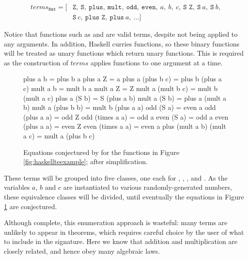 \begin{align*}
  terms_{\texttt{Nat}} = [& \texttt{Z},\ \texttt{S},\ \texttt{plus},\ \texttt{mult},\ \texttt{odd},\ \texttt{even},\ a,\ b,\ c,\ \texttt{S Z},\ \texttt{S}\ a,\ \texttt{S}\ b, \\
                     & \texttt{S}\ c,\ \texttt{plus Z},\ \texttt{plus}\ a,\ \dots ]
\end{align*}

Notice that functions such as  and  are valid terms, despite
not being applied to any arguments. In addition, Haskell curries functions, so
these binary functions will be treated as unary functions which return unary
functions. This is required as the construction of $terms$ applies functions to
one argument at a time.

\begin{figure}
  \begin{haskell}
                      plus a b = plus b a
                      plus a Z = a
             plus a (plus b c) = plus b (plus a c)
                      mult a b = mult b a
                      mult a Z = Z
             mult a (mult b c) = mult b (mult a c)
                  plus a (S b) = S (plus a b)
                  mult a (S b) = plus a (mult a b)
             mult a (plus b b) = mult b (plus a a)
                     odd (S a) = even a
                odd (plus a a) = odd Z
               odd (times a a) = odd a
                    even (S a) = odd a
               even (plus a a) = even Z
              even (times a a) = even a
    plus (mult a b) (mult a c) = mult a (plus b c)
  \end{haskell}
  \caption{Equations conjectured by \qspec{} for the functions in Figure
    \ref{fig:haskellteexample}; after simplification.}
  \label{fig:qspecresult}
\end{figure}

These terms will be grouped into five classes, one each for ,
, ,  and . As the
variables $a$, $b$ and $c$ are instantiated to various randomly-generated
numbers, these equivalence classes will be divided, until eventually the
equations in Figure \ref{fig:qspecresult} are conjectured.

Although complete, this enumeration approach is wasteful: many terms are
unlikely to appear in theorems, which requires careful choice by the user of
what to include in the signature. Here we know that addition and multiplication
are closely related, and hence obey many algebraic laws.

